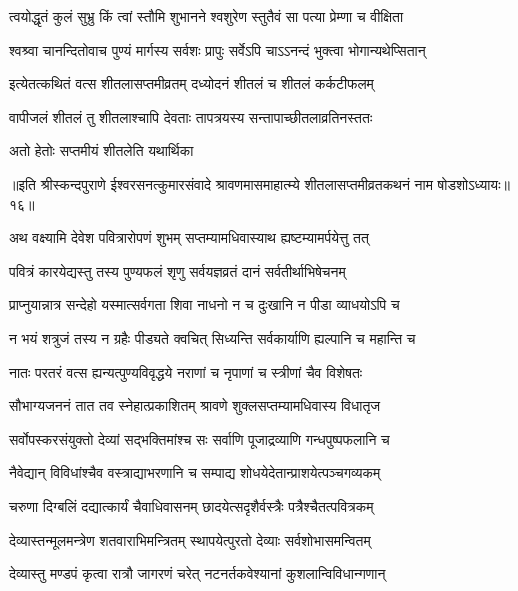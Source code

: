 \twolineshloka
{त्वयोद्धृतं कुलं सुभ्रु किं त्वां स्तौमि शुभानने}
{श्वशुरेण स्तुतैवं सा पत्या प्रेम्णा च वीक्षिता} %

\twolineshloka
{श्वश्र्वा चानन्दितोवाच पुण्यं मार्गस्य सर्वशः}
{प्रापुः सर्वेऽपि चाऽऽनन्दं भुक्त्वा भोगान्यथेप्सितान्} %

\twolineshloka
{इत्येतत्कथितं वत्स शीतलासप्तमीव्रतम्}
{दध्योदनं शीतलं च शीतलं कर्कटीफलम्} %

\twolineshloka
{वापीजलं शीतलं तु शीतलाश्चापि देवताः}
{तापत्रयस्य सन्तापाच्छीतलाव्रतिनस्ततः} %

\onelineshloka
{अतो हेतोः सप्तमीयं शीतलेति यथार्थिका} %


{॥इति श्रीस्कन्दपुराणे ईश्वरसनत्कुमारसंवादे श्रावणमासमाहात्म्ये शीतलासप्तमीव्रतकथनं नाम षोडशोऽध्यायः॥१६॥}





\twolineshloka
{अथ वक्ष्यामि देवेश पवित्रारोपणं शुभम्}
{सप्तम्यामधिवास्याथ ह्यष्टम्यामर्पयेत्तु तत्} %

\twolineshloka
{पवित्रं कारयेद्यस्तु तस्य पुण्यफलं शृणु}
{सर्वयज्ञव्रतं दानं सर्वतीर्थाभिषेचनम्} %

\twolineshloka
{प्राप्नुयान्नात्र सन्देहो यस्मात्सर्वगता शिवा}
{नाधनो न च दुःखानि न पीडा व्याधयोऽपि च} %

\twolineshloka
{न भयं शत्रुजं तस्य न ग्रहैः पीड्यते क्वचित्}
{सिध्यन्ति सर्वकार्याणि ह्यल्पानि च महान्ति च} %

\twolineshloka
{नातः परतरं वत्स ह्यन्यत्पुण्यविवृद्धये}
{नराणां च नृपाणां च स्त्रीणां चैव विशेषतः} %

\twolineshloka
{सौभाग्यजननं तात तव स्नेहात्प्रकाशितम्}
{श्रावणे शुक्लसप्तम्यामधिवास्य विधातृज} %

\twolineshloka
{सर्वोपस्करसंयुक्तो देव्यां सद्भक्तिमांश्च सः}
{सर्वाणि पूजाद्रव्याणि गन्धपुष्पफलानि च} %

\twolineshloka
{नैवेद्यान् विविधांश्चैव वस्त्राद्याभरणानि च}
{सम्पाद्य शोधयेदेतान्प्राशयेत्पञ्चगव्यकम्} %

\twolineshloka
{चरुणा दिग्बलिं दद्यात्कार्यं चैवाधिवासनम्}
{छादयेत्सदृशैर्वस्त्रैः पत्रैश्चैतत्पवित्रकम्} %

\twolineshloka
{देव्यास्तन्मूलमन्त्रेण शतवाराभिमन्त्रितम्}
{स्थापयेत्पुरतो देव्याः सर्वशोभासमन्वितम्} %

\twolineshloka
{देव्यास्तु मण्डपं कृत्वा रात्रौ जागरणं चरेत्}
{नटनर्तकवेश्यानां कुशलान्विविधान्गणान्} %

